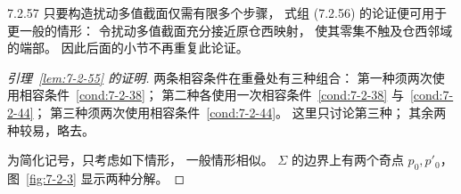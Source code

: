 \begin{remark}{7.2.57}\label{rem:7-2-57}
只要构造扰动多值截面仅需有限多个步骤，
式组 (7.2.56) 的论证便可用于更一般的情形：
令扰动多值截面充分接近原仓西映射，
使其零集不触及仓西邻域的端部。
因此后面的小节不再重复此论证。
\end{remark}

\begin{proof}[引理~\ref{lem:7-2-55} 的证明]
两条相容条件在重叠处有三种组合：
第一种须两次使用相容条件~\ref{cond:7-2-38}；
第二种各使用一次相容条件~\ref{cond:7-2-38}
与~\ref{cond:7-2-44}；
第三种须两次使用相容条件~\ref{cond:7-2-44}。
这里只讨论第三种；
其余两种较易，略去。

为简化记号，只考虑如下情形，
一般情形相似。
$\Sigma$ 的边界上有两个奇点
$p_0,p'_0$，
图~\ref{fig:7-2-3} 显示两种分解。


\end{proof}
